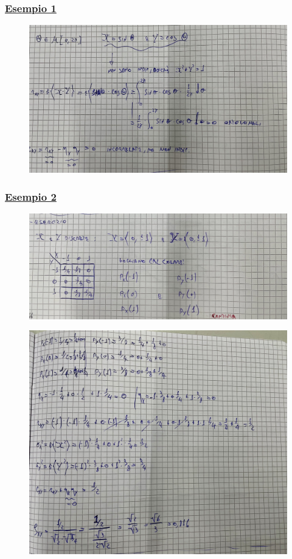 \documentclass{article}
\begin{document}
\subsubsection{\underline{Esempio 1}}
\begin{figure}[H]
\centering
\includegraphics[scale=0.13]{ese/51.jpeg}
\end{figure} 
\subsubsection{\underline{Esempio 2}}
\begin{figure}[H]
\centering
\includegraphics[scale=0.13]{ese/52.jpeg}
\end{figure} 
\begin{figure}[H]
\centering
\includegraphics[scale=0.13]{ese/52a.jpeg}
\end{figure}
\end{document}
